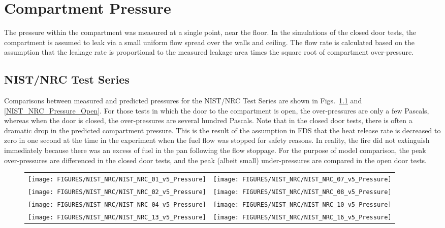 \chapter{Compartment Pressure}

The pressure within the compartment was measured at a single point, near the floor.
In the simulations of the closed door tests, the compartment is assumed to leak via a small uniform flow spread
over the walls and ceiling.  The flow rate is calculated based on the assumption that the leakage rate is proportional
to the measured leakage area times the square root of compartment over-pressure.


\section{NIST/NRC Test Series}

Comparisons between measured and predicted pressures for the NIST/NRC Test Series are shown
in Figs.~\ref{NIST_NRC_Pressure_Closed} and \ref{NIST_NRC_Pressure_Open}.
For those tests in which the door to the compartment is
open, the over-pressures are only a few Pascals, whereas when the door is closed, the over-pressures are several hundred Pascals.
Note that in the closed door tests, there is often a dramatic drop in the predicted compartment pressure.
This is the result of the assumption in FDS that the heat release rate is decreased to zero in one second at the time
in the experiment when the fuel flow was stopped for safety reasons.  In reality, the fire did not extinguish
immediately because there was an excess of fuel in the pan following the flow stoppage.
For the purpose of model comparison, the peak over-pressures are differenced in the closed door tests,
and the peak (albeit small) under-pressures are compared in the open door tests.

\begin{figure}[p]
\begin{tabular*}{\textwidth}{l@{\extracolsep{\fill}}r}
\texttt{[image: FIGURES/NIST\_NRC/NIST\_NRC\_01\_v5\_Pressure]} &
\texttt{[image: FIGURES/NIST\_NRC/NIST\_NRC\_07\_v5\_Pressure]} \\
\texttt{[image: FIGURES/NIST\_NRC/NIST\_NRC\_02\_v5\_Pressure]} &
\texttt{[image: FIGURES/NIST\_NRC/NIST\_NRC\_08\_v5\_Pressure]} \\
\texttt{[image: FIGURES/NIST\_NRC/NIST\_NRC\_04\_v5\_Pressure]} &
\texttt{[image: FIGURES/NIST\_NRC/NIST\_NRC\_10\_v5\_Pressure]} \\
\texttt{[image: FIGURES/NIST\_NRC/NIST\_NRC\_13\_v5\_Pressure]} &
\texttt{[image: FIGURES/NIST\_NRC/NIST\_NRC\_16\_v5\_Pressure]}
\end{tabular*}
\label{NIST_NRC_Pressure_Closed}
\end{figure}

